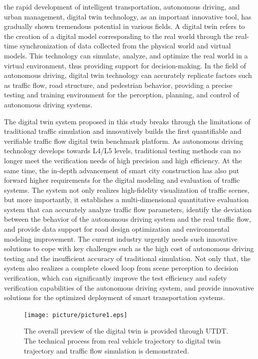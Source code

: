 \documentclass[journal,twoside,web]{ieeecolor}
\begin{document}
 the rapid development of intelligent transportation, autonomous driving, and urban management, digital twin technology, as an important innovative tool, has gradually shown tremendous potential in various fields\cite{Alpher17}. 
A digital twin refers to the creation of a digital model corresponding to the real world through the real-time synchronization of data collected from the physical world and virtual models\cite{Alpher20c}. 
This technology can simulate, analyze, and optimize the real world in a virtual environment, thus providing support for decision-making\cite{Alpher21b}. 
In the field of autonomous driving, digital twin technology can accurately replicate factors such as traffic flow, road structure, and pedestrian behavior, providing a precise testing and training environment for the perception, planning, and control of autonomous driving systems\cite{Alpher24}\cite{Alpher20d}.

The digital twin system proposed in this study breaks through the limitations of traditional traffic simulation and innovatively builds the first quantifiable and verifiable traffic flow digital twin benchmark platform.
As autonomous driving technology develops towards L4/L5 levels, traditional testing methods can no longer meet the verification needs of high precision and high efficiency\cite{Alpher24b}.
At the same time, the in-depth advancement of smart city construction has also put forward higher requirements for the digital modeling and evaluation of traffic systems.
The system not only realizes high-fidelity visualization of traffic scenes, but more importantly, it establishes a multi-dimensional quantitative evaluation system that can accurately analyze traffic flow parameters, identify the deviation between the behavior of the autonomous driving system and the real traffic flow, and provide data support for road design optimization and environmental modeling improvement.
The current industry urgently needs such innovative solutions to cope with key challenges such as the high cost of autonomous driving testing and the insufficient accuracy of traditional simulation\cite{Alpher22c}.
Not only that, the system also realizes a complete closed loop from scene perception to decision verification, which can significantly improve the test efficiency and safety verification capabilities of the autonomous driving system, and provide innovative solutions for the optimized deployment of smart transportation systems\cite{Alpher17b}.

\begin{figure}[!t]
	\centerline{\texttt{[image: picture/picture1.eps]}}
	\caption{The overall preview of the digital twin is provided through UTDT. The technical process from real vehicle trajectory to digital twin trajectory and traffic flow simulation is demonstrated.}
	\label{fig:1}
\end{figure}
\end{document}
